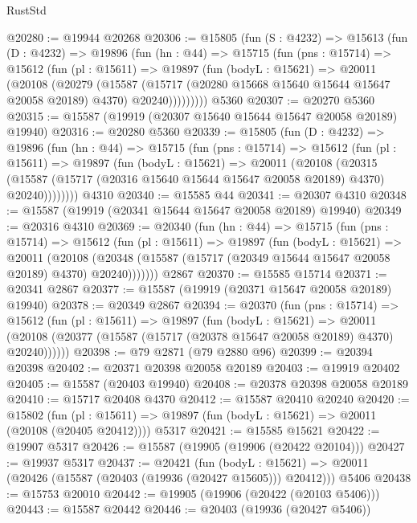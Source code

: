 \begin{lexlean}{RustStd}
\begin{coremodule}
@20280 := @19944 @20268
@20306 := @15805
    (fun (S : @4232) =>
    @15613
      (fun (D : @4232) =>
      @19896
        (fun (hn : @44) =>
        @15715
          (fun (pns : @15714) =>
          @15612
            (fun (pl : @15611) =>
            @19897
              (fun (bodyL : @15621) =>
              @20011
                (@20108
                  (@20279
                    (@15587
                      (@15717 (@20280 @15668 @15640 @15644 @15647 @20058 @20189) @4370)
                      @20240)))))))))
    @5360
@20307 := @20270 @5360
@20315 := @15587 (@19919 (@20307 @15640 @15644 @15647 @20058 @20189) @19940)
@20316 := @20280 @5360
@20339 := @15805
    (fun (D : @4232) =>
    @19896
      (fun (hn : @44) =>
      @15715
        (fun (pns : @15714) =>
        @15612
          (fun (pl : @15611) =>
          @19897
            (fun (bodyL : @15621) =>
            @20011
              (@20108
                (@20315
                  (@15587 (@15717 (@20316 @15640 @15644 @15647 @20058 @20189) @4370) @20240))))))))
    @4310
@20340 := @15585 @44
@20341 := @20307 @4310
@20348 := @15587 (@19919 (@20341 @15644 @15647 @20058 @20189) @19940)
@20349 := @20316 @4310
@20369 := @20340
    (fun (hn : @44) =>
    @15715
      (fun (pns : @15714) =>
      @15612
        (fun (pl : @15611) =>
        @19897
          (fun (bodyL : @15621) =>
          @20011
            (@20108
              (@20348 (@15587 (@15717 (@20349 @15644 @15647 @20058 @20189) @4370) @20240)))))))
    @2867
@20370 := @15585 @15714
@20371 := @20341 @2867
@20377 := @15587 (@19919 (@20371 @15647 @20058 @20189) @19940)
@20378 := @20349 @2867
@20394 := @20370
    (fun (pns : @15714) =>
    @15612
      (fun (pl : @15611) =>
      @19897
        (fun (bodyL : @15621) =>
        @20011 (@20108 (@20377 (@15587 (@15717 (@20378 @15647 @20058 @20189) @4370) @20240))))))
@20398 := @79 @2871 (@79 @2880 @96)
@20399 := @20394 @20398
@20402 := @20371 @20398 @20058 @20189
@20403 := @19919 @20402
@20405 := @15587 (@20403 @19940)
@20408 := @20378 @20398 @20058 @20189
@20410 := @15717 @20408 @4370
@20412 := @15587 @20410 @20240
@20420 := @15802
    (fun (pl : @15611) => @19897 (fun (bodyL : @15621) => @20011 (@20108 (@20405 @20412))))
    @5317
@20421 := @15585 @15621
@20422 := @19907 @5317
@20426 := @15587 (@19905 (@19906 (@20422 @20104)))
@20427 := @19937 @5317
@20437 := @20421
    (fun (bodyL : @15621) => @20011 (@20426 (@15587 (@20403 (@19936 (@20427 @15605))) @20412)))
    @5406
@20438 := @15753 @20010
@20442 := @19905 (@19906 (@20422 (@20103 @5406)))
@20443 := @15587 @20442
@20446 := @20403 (@19936 (@20427 @5406))

\end{coremodule}
\end{lexlean}
